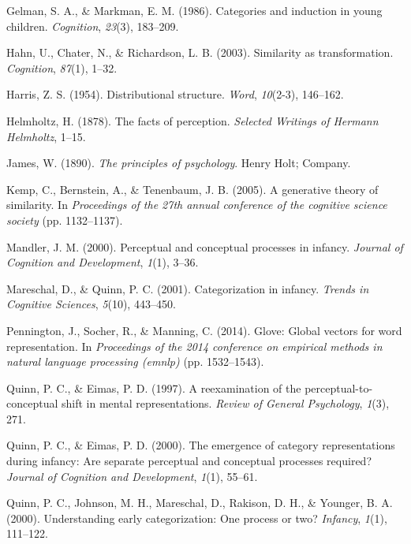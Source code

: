 \documentclass[10pt, letterpaper]{article}
\begin{document}
\hypertarget{ref-gelman1986categories}{}
Gelman, S. A., \& Markman, E. M. (1986). Categories and induction in
young children. \emph{Cognition}, \emph{23}(3), 183--209.

\hypertarget{ref-hahn2003similarity}{}
Hahn, U., Chater, N., \& Richardson, L. B. (2003). Similarity as
transformation. \emph{Cognition}, \emph{87}(1), 1--32.

\hypertarget{ref-harris1954distributional}{}
Harris, Z. S. (1954). Distributional structure. \emph{Word},
\emph{10}(2-3), 146--162.

\hypertarget{ref-helmholtz1878facts}{}
Helmholtz, H. (1878). The facts of perception. \emph{Selected Writings
of Hermann Helmholtz}, 1--15.

\hypertarget{ref-james2013principles}{}
James, W. (1890). \emph{The principles of psychology}. Henry Holt;
Company.

\hypertarget{ref-kemp2005generative}{}
Kemp, C., Bernstein, A., \& Tenenbaum, J. B. (2005). A generative theory
of similarity. In \emph{Proceedings of the 27th annual conference of the
cognitive science society} (pp. 1132--1137).

\hypertarget{ref-mandler2000perceptual}{}
Mandler, J. M. (2000). Perceptual and conceptual processes in infancy.
\emph{Journal of Cognition and Development}, \emph{1}(1), 3--36.

\hypertarget{ref-mareschal2001categorization}{}
Mareschal, D., \& Quinn, P. C. (2001). Categorization in infancy.
\emph{Trends in Cognitive Sciences}, \emph{5}(10), 443--450.

\hypertarget{ref-pennington2014glove}{}
Pennington, J., Socher, R., \& Manning, C. (2014). Glove: Global vectors
for word representation. In \emph{Proceedings of the 2014 conference on
empirical methods in natural language processing (emnlp)} (pp.
1532--1543).

\hypertarget{ref-quinn1997reexamination}{}
Quinn, P. C., \& Eimas, P. D. (1997). A reexamination of the
perceptual-to-conceptual shift in mental representations. \emph{Review
of General Psychology}, \emph{1}(3), 271.

\hypertarget{ref-quinn2000emergence}{}
Quinn, P. C., \& Eimas, P. D. (2000). The emergence of category
representations during infancy: Are separate perceptual and conceptual
processes required? \emph{Journal of Cognition and Development},
\emph{1}(1), 55--61.

\hypertarget{ref-quinn2000understanding}{}
Quinn, P. C., Johnson, M. H., Mareschal, D., Rakison, D. H., \& Younger,
B. A. (2000). Understanding early categorization: One process or two?
\emph{Infancy}, \emph{1}(1), 111--122.
\end{document}
